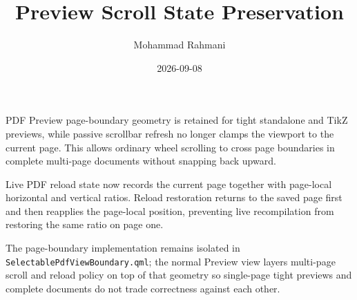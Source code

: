 \documentclass[a4paper]{article}
\title{Preview Scroll State Preservation}
\date{2026-09-08}
\author{Mohammad Rahmani}
\begin{document}
   \maketitle

   \begin{preview}
      PDF Preview page-boundary geometry is retained for tight standalone and TikZ previews, while passive scrollbar refresh no longer clamps the viewport to the current page. This allows ordinary wheel scrolling to cross page boundaries in complete multi-page documents without snapping back upward.

      Live PDF reload state now records the current page together with page-local horizontal and vertical ratios. Reload restoration returns to the saved page first and then reapplies the page-local position, preventing live recompilation from restoring the same ratio on page one.

      The page-boundary implementation remains isolated in \texttt{SelectablePdfViewBoundary.qml}; the normal Preview view layers multi-page scroll and reload policy on top of that geometry so single-page tight previews and complete documents do not trade correctness against each other.
   \end{preview}

   
   
\end{document}
